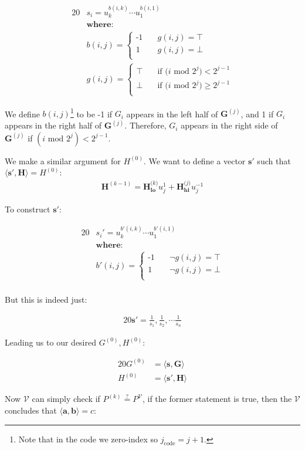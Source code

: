 \documentclass{article}
\newcommand{\eq}[1]{\begin{alignat*}{20}#1\end{alignat*}}
\newcommand{\eqn}[2]{\begin{equation}\label{#1}\begin{split}#2\end{split}\end{equation}}
\renewcommand{\vec}[1]{\boldsymbol{#1}}
\newcommand{\V}{\mathcal{V}}
\newcommand{\dotp}[2]{\langle #1, #2 \rangle}
\newcommand{\opn}[1]{\operatorname{#1}}
\newcommand{\veclo}[1]{\vec{#1_{\opn{lo}}}}
\newcommand{\vechi}[1]{\vec{#1_{\opn{hi}}}}
\begin{document}
\eq{
	&s_i = u^{b(i,k)}_k \cdots u^{b(i,1)}_1 \\
	&\textbf{where:} \\
	&b(i,j) = 
	\begin{cases}
		\text{-1} &\quad  g(i,j) = \top \\
		\text{1}  &\quad  g(i,j) = \bot \\
	\end{cases} \\
	&g(i,j) = 
	\begin{cases}
		\top &\quad  \text{if $(i$ mod $2^j) <    2^{j-1}$} \\
		\bot &\quad  \text{if $(i$ mod $2^j) \geq 2^{j-1}$} \\
	\end{cases}
}

We define $b(i,j)$\footnote{Note that in the code we zero-index
so $j_{\text{code}} = j+1$.} to be -1 if $G_i$ appears in the left
half of $\vec{G}^{(j)}$, and 1 if $G_i$ appears in the right half
of $\vec{G}^{(j)}$. Therefore, $G_i$ appears in the right side of
$\vec{G}^{(j)}$ if $(i \text{ mod } 2^j) < 2^{j-1}$.

We make a similar argument for $H^{(0)}$. We want to define a vector
$\vec{s'}$ such that $\dotp{\vec{s'}}{\vec{H}} = H^{(0)}$:
\eqn{H0}{
	\vec{H}^{(k-1)} = \veclo{H^\textit{(k)}} u^{1}_j + \vechi{H^\textit{(j)}} u^{-1}_j
}

To construct $\vec{s'}$:

\eq{
	&s_i' = u^{b'(i,k)}_k \cdots u^{b'(i,1)}_1 \\
	&\textbf{where:} \\
	&b'(i,j) = 
	\begin{cases}
		\text{-1} &\quad  \lnot g(i,j) = \top \\
		\text{1}  &\quad  \lnot g(i,j) = \bot \\
	\end{cases} \\
}

But this is indeed just:

\eq{
	\vec{s'} = \frac{1}{s_1}, \frac{1}{s_2}, \cdots \frac{1}{s_n}
}

Leading us to our desired $G^{(0)}, H^{(0)}$:

\eq{
	G^{(0)} &= \dotp{\vec{s}}{\vec{G}} \\
	H^{(0)} &= \dotp{\vec{s'}}{\vec{H}}
}

Now $\V$ can simply check if $P^{(k)} \stackrel{?}{=} P^{\V}$,
if the former statement is true, then the $\V$ concludes that
$\dotp{\vec{a}}{\vec{b}} = c$:
\end{document}
